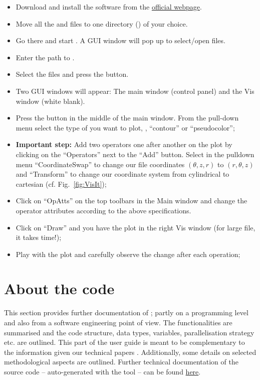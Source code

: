 \documentclass[a4paper, 11pt, DIV=11]{scrartcl}
\begin{document}
\begin{itemize}
\item Download and install the software from the \href{https://wci.llnl.gov/simulation/computer-codes/visit}{official webpage}.
\item Move all the  and  files to one directory () of your choice.
\item Go there and start \visit. A GUI window will pop up to select/open files.
\item Enter the path to .
\item Select the  files and press the  button.
\item Two GUI windows will appear: The \visit main window (control panel) and the Vis window (white blank).
\item Press the  button in the middle of the main window. From the
pull-down menu select the type of you want to plot, \textit{\eg}, ``contour'' or ``pseudocolor'';
  \item  \textbf{Important step:} Add two operators one after another on the plot by clicking on the ``Operators'' next to the ``Add'' button.
 Select in the pulldown menu ``CoordinateSwap'' to change our file coordinates $(\theta,z,r)$ to $(r,\theta,z)$
 and ``Transform'' to change our coordinate system from
 cylindrical to cartesian (cf. Fig.~\ref{fig:VisIt});
  \item  Click on ``OpAtts'' on the top toolbars in the Main window and change the operator attributes according to the above specifications.
  \item  Click on ``Draw'' and you have the plot in the right Vis window (for large file, it takes time!);
  \item  Play with the plot and carefully observe the change after each operation;
\end{itemize}



\section{About the code}
\label{sec:aboutTheCode}

This section provides further documentation of \nsc; partly on a programming
level and also from a software engineering point of view. The functionalities
are summarised and the code structure, data types, variables, parallelisation
strategy etc. are outlined. This part of the user guide is meant to be
complementary to the information given our technical papers \cite{}. Additionally,
some details on selected methodological aspects are outlined. Further
technical documentation of the source code -- auto-generated with the
 tool -- can be found
\href{http://mjr.pages.mpcdf.de/nscouette/ford-doc/}{here}.
\end{document}

